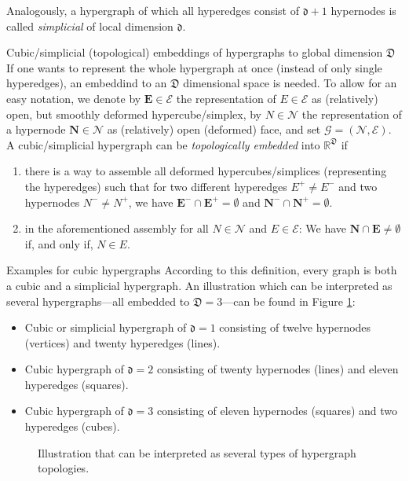 \documentclass[a4paper, english, 12pt, reqno, draft]{amsart}
\makeatletter
\theoremstyle{definition}
\theoremstyle{remark}
\numberwithin{equation}{section}
\newcommand{\setEdge}{\ensuremath{\mathcal E}}
\newcommand{\setNode}{\ensuremath{\mathcal N}}
\newcommand{\edge}{\ensuremath{E}}
\newcommand{\node}{\ensuremath{N}}
\newcommand{\Graph}{\ensuremath{\boldsymbol{\mathcal G}}}
\newcommand{\SetEdge}{\ensuremath{\boldsymbol{\mathcal E}}}
\newcommand{\SetNode}{\ensuremath{\boldsymbol{\mathcal N}}}
\newcommand{\Edge}{{\ensuremath{\boldsymbol E}}}
\newcommand{\Node}{{\ensuremath{\boldsymbol N}}}
\newcommand{\locDim}{\ensuremath{\mathfrak d}}
\newcommand{\globDim}{\ensuremath{\mathfrak D}}
\newcommand{\IR}{\ensuremath{\mathbb R}}
\def\paragraph{\@startsection{paragraph}{4}%
  \z@\z@{-\fontdimen2\font}%
  {\normalfont\scshape}}
\makeatother
\begin{document}
Analogously, a hypergraph of which all hyperedges consist of $\locDim+1$ hypernodes is called \emph{simplicial} of local dimension $\locDim$.

\paragraph{Cubic/simplicial (topological) embeddings of hypergraphs to global dimension $\globDim$}
% 
If one wants to represent the whole hypergraph at once (instead of only single hyperedges), an embeddind to an $\globDim$ dimensional space is needed. To allow for an easy notation, we denote by $\Edge \in \SetEdge$ the representation of $\edge \in \setEdge$ as (relatively) open, but smoothly deformed hypercube/simplex, by $\node \in \setNode$ the representation of a hypernode $\Node \in \SetNode$ as (relatively) open (deformed) face, and set $\Graph = (\SetNode, \SetEdge)$. A cubic/simplicial hypergraph can be \emph{topologically embedded} into $\IR^\globDim$ if
% 
\begin{enumerate}
 \item there is a way to assemble all deformed hypercubes/simplices (representing the hyperedges) such that for two different hyperedges $\edge^+ \neq \edge^-$ and two hypernodes $\node^- \neq \node^+$, we have $\Edge^- \cap \Edge^+ = \emptyset$ and $\Node^- \cap \Node^+ = \emptyset$.
 \item in the aforementioned assembly for all $\node \in \setNode$ and $\edge \in \setEdge$: We have $\Node \cap \Edge \neq \emptyset$ if, and only if, $\node \in \edge$.
\end{enumerate}
% 
\paragraph{Examples for cubic hypergraphs}
% 
According to this definition, every graph is both a cubic and a simplicial hypergraph. An illustration which can be interpreted as several hypergraphs---all embedded to $\globDim = 3$---can be found in Figure \ref{FIG:hyG_topo}:
% 
\begin{itemize}
 \item Cubic or simplicial hypergraph of $\locDim = 1$ consisting of twelve hypernodes (vertices) and  twenty hyperedges (lines).
 \item Cubic hypergraph of $\locDim = 2$ consisting of twenty hypernodes (lines) and eleven hyperedges (squares).
 \item Cubic hypergraph of $\locDim = 3$ consisting of eleven hypernodes (squares) and two hyperedges (cubes).
\end{itemize}
% 
\begin{figure}[ht]
 \caption{Illustration that can be interpreted as several types of hypergraph topologies.}\label{FIG:hyG_topo}
\end{figure}
% 
\end{document}
